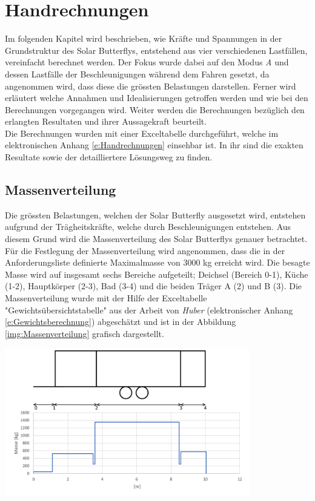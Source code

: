 \section{Handrechnungen}
\label{Handrechnungen}
Im folgenden Kapitel wird beschrieben, wie Kräfte und Spannungen in der Grundstruktur des Solar Butterflys, entstehend aus vier verschiedenen Lastfällen, vereinfacht berechnet werden. Der Fokus wurde dabei auf den Modus \emph{A} und dessen Lastfälle der Beschleunigungen während dem Fahren gesetzt, da angenommen wird, dass diese die grössten Belastungen darstellen. Ferner wird erläutert welche Annahmen und Idealisierungen getroffen werden und wie bei den Berechnungen vorgegangen wird. Weiter werden die Berechnungen bezüglich den erlangten Resultaten und ihrer Aussagekraft beurteilt.\\
Die Berechnungen wurden mit einer Exceltabelle durchgeführt, welche im elektronischen Anhang \ref{e:Handrechnungen} einsehbar ist. In ihr sind die exakten Resultate sowie der detailliertere Lösungsweg zu finden.

\subsection{Massenverteilung}
\label{Massenverteilung}
Die grössten Belastungen, welchen der Solar Butterfly ausgesetzt wird, entstehen aufgrund der Trägheitskräfte, welche durch Beschleunigungen entstehen. Aus diesem Grund wird die Massenverteilung des Solar Butterflys genauer betrachtet.\\
Für die Festlegung der Massenverteilung wird angenommen, dass die in der Anforderungsliste definierte Maximalmasse von 3000 kg erreicht wird. Die besagte Masse wird auf insgesamt sechs Bereiche aufgeteilt; Deichsel (Bereich 0-1), Küche (1-2), Hauptkörper (2-3), Bad (3-4) und die beiden Träger A (2) und B (3). Die Massenverteilung wurde mit der Hilfe der Exceltabelle "Gewichtsübersichtstabelle" aus der Arbeit von \emph{Huber} \cite{Huber} (elektronischer Anhang \ref{e:Gewichtsberechnung}) abgeschätzt und ist in der Abbildung \ref{img:Massenverteilung} grafisch dargestellt.

\begin{center}
  \includegraphics[width=0.8\textwidth]{04_Figures/Massenverteilung.png}
  \label{img:Massenverteilung}
\end{center}

